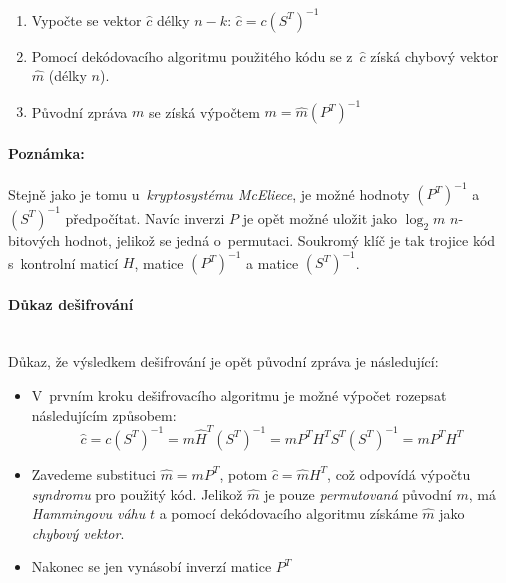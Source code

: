 \documentclass[thesis=M,czech,hidelinks]{FITthesis}[2012/06/26]
\newcommand{\0}{{\textcolor[gray]{0.80}{0}}}
\begin{document}
\begin{enumerate}
    \item Vypočte se vektor $\hat{c}$ délky $n-k$:
        $\hat{c} = c \left(S^T\right)^{-1} $
    \item Pomocí dekódovacího algoritmu použitého kódu se z~$\hat{c}$ získá
        chybový vektor $\hat{m}$ (délky $n$).
    \item Původní zpráva $m$ se získá výpočtem
        $m = \hat{m} \left(P^T\right)^{-1}$
\end{enumerate}


\paragraph{Poznámka:} Stejně jako je tomu u~\emph{kryptosystému McEliece}, je
možné hodnoty $\left(P^T\right)^{-1}$ a $\left(S^T\right)^{-1}$ předpočítat.
Navíc inverzi $P$ je opět možné uložit jako $\log_2 m$ $n$-bitových hodnot,
jelikož se jedná o~permutaci. Soukromý klíč je tak trojice kód s~kontrolní
maticí $H$, matice $\left(P^T\right)^{-1}$ a matice $\left(S^T\right)^{-1}$.


\paragraph{Důkaz dešifrování} \hfill \\
Důkaz, že výsledkem dešifrování je opět původní zpráva je následující:

\begin{itemize}
    \item V~prvním kroku dešifrovacího algoritmu je možné výpočet rozepsat
        následujícím způsobem:
    $$
        \hat{c} =   c \left(S^T\right)^{-1} =
                    m \hat{H}^T \left(S^T\right)^{-1} =
                    m P^T H^T S^T \left(S^T\right)^{-1} =
                    m P^T H^T
    $$

    \item Zavedeme substituci $\hat{m} = m P^T$, potom $\hat{c} = \hat{m} H^T$,
        což odpovídá výpočtu \emph{syndromu} pro použitý kód. Jelikož $\hat{m}$
        je pouze \emph{permutovaná} původní $m$, má \emph{Hammingovu váhu} $t$
        a pomocí dekódovacího algoritmu získáme $\hat{m}$ jako \emph{chybový
        vektor}.
    \item Nakonec se jen vynásobí inverzí matice $P^T$

\end{itemize}

\end{document}
